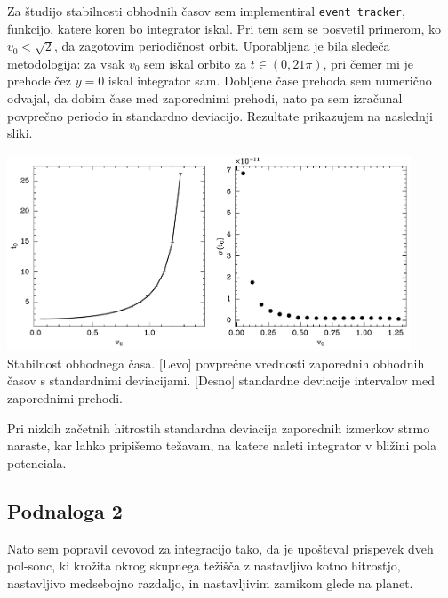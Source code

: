 Za študijo stabilnosti obhodnih časov sem implementiral \texttt{event tracker}, funkcijo, katere koren bo integrator iskal. Pri tem sem se posvetil primerom, ko $v_0<\sqrt{2}$, da zagotovim periodičnost orbit. Uporabljena je bila sledeča metodologija: za vsak $v_0$ sem iskal orbito za $t\in \left(0, 21\pi \right)$, pri čemer mi je prehode čez $y=0$ iskal integrator sam.  Dobljene čase prehoda sem numerično odvajal, da dobim čase med zaporednimi prehodi, nato pa sem izračunal povprečno periodo in standardno deviacijo. Rezultate prikazujem na naslednji sliki.


\begin{center}
    \centering
    \includegraphics[width=0.9\textwidth]{../images/1-2-t0.pdf}
    {Stabilnost obhodnega časa. [Levo] povprečne vrednosti zaporednih obhodnih časov s standardnimi deviacijami. [Desno] standardne deviacije intervalov med zaporednimi prehodi.}
\end{center}

Pri nizkih začetnih hitrostih standardna deviacija zaporednih izmerkov strmo naraste, kar lahko pripišemo težavam, na katere naleti integrator v bližini pola potenciala.
\subsection{Podnaloga 2}

Nato sem popravil cevovod za integracijo tako, da je upošteval prispevek dveh pol-sonc, ki krožita okrog skupnega težišča z nastavljivo kotno hitrostjo, nastavljivo medsebojno razdaljo, in nastavljivim zamikom glede na planet.

